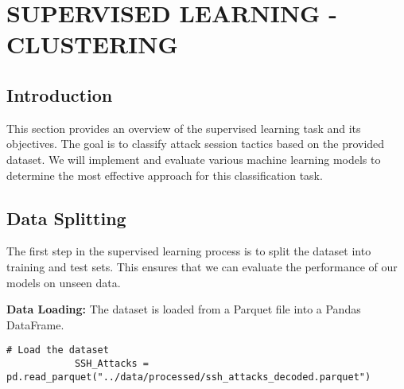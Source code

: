 

\section{SUPERVISED LEARNING - CLUSTERING}


    \subsection{Introduction}
    
        This section provides an overview of the supervised learning task and its objectives. The goal is to classify attack session tactics based on the provided dataset. We will implement and evaluate various machine learning models to determine the most effective approach for this classification task.

    \subsection{Data Splitting}
    
        The first step in the supervised learning process is to split the dataset into training and test sets. This ensures that we can evaluate the performance of our models on unseen data.

        \textbf{Data Loading:} The dataset is loaded from a Parquet file into a Pandas DataFrame.

        \vspace{0.5em}

        \begin{lstlisting}[caption={Load the dataset}, label={lst:load_dataset}]
            # Load the dataset
            SSH_Attacks = pd.read_parquet("../data/processed/ssh_attacks_decoded.parquet")
        \end{lstlisting}

